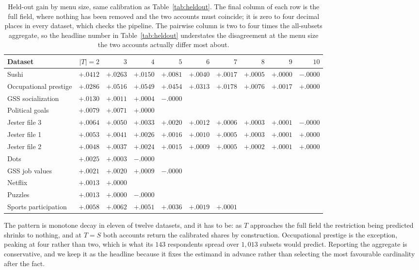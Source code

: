 \documentclass[11pt]{article}
\begin{document}
\begin{table}[ht]
\centering
\small
\begin{tabular}{lrrrrrrrrr}
\toprule
Dataset & $|T|{=}2$ & $3$ & $4$ & $5$ & $6$ & $7$ & $8$ & $9$ & $10$ \\
\midrule
Sushi & $+.0412$ & $+.0263$ & $+.0150$ & $+.0081$ & $+.0040$ & $+.0017$ & $+.0005$ & $+.0000$ & $-.0000$ \\
Occupational prestige & $+.0286$ & $+.0516$ & $+.0549$ & $+.0454$ & $+.0313$ & $+.0178$ & $+.0076$ & $+.0017$ & $+.0000$ \\
GSS socialization & $+.0130$ & $+.0011$ & $+.0004$ & $-.0000$ & & & & & \\
Political goals & $+.0079$ & $+.0071$ & $+.0000$ & & & & & & \\
Jester file 3 & $+.0064$ & $+.0050$ & $+.0033$ & $+.0020$ & $+.0012$ & $+.0006$ & $+.0003$ & $+.0001$ & $-.0000$ \\
Jester file 1 & $+.0053$ & $+.0041$ & $+.0026$ & $+.0016$ & $+.0010$ & $+.0005$ & $+.0003$ & $+.0001$ & $+.0000$ \\
Jester file 2 & $+.0048$ & $+.0037$ & $+.0024$ & $+.0015$ & $+.0009$ & $+.0005$ & $+.0002$ & $+.0001$ & $+.0000$ \\
Dots & $+.0025$ & $+.0003$ & $-.0000$ & & & & & & \\
GSS job values & $+.0021$ & $+.0020$ & $+.0009$ & $-.0000$ & & & & & \\
Netflix & $+.0013$ & $+.0000$ & & & & & & & \\
Puzzles & $+.0013$ & $+.0000$ & $-.0000$ & & & & & & \\
\midrule
Sports participation & $+.0058$ & $+.0062$ & $+.0051$ & $+.0036$ & $+.0019$ & $+.0001$ & & & \\
\bottomrule
\end{tabular}
\caption{Held-out gain by menu size, same calibration as
Table~\ref{tab:heldout}. The final column of each row is the full field, where nothing
has been removed and the two accounts must coincide; it is zero to four decimal places
in every dataset, which checks the pipeline. The pairwise column is two to four times
the all-subsets aggregate, so the headline number in Table~\ref{tab:heldout}
understates the disagreement at the menu size the two accounts actually differ most
about.}
\label{tab:bysize}
\end{table}

The pattern is monotone decay in eleven of twelve datasets, and it has to be: as $T$
approaches the full field the restriction being predicted shrinks to nothing, and at
$T = S$ both accounts return the calibrated shares by construction. Occupational
prestige is the exception, peaking at four rather than two, which is what its $143$
respondents spread over $1{,}013$ subsets would predict. Reporting the aggregate is
conservative, and we keep it as the headline because it fixes the estimand in advance
rather than selecting the most favourable cardinality after the fact.
\end{document}

